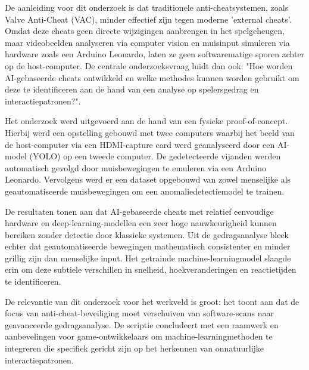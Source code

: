 De aanleiding voor dit onderzoek is dat traditionele anti-cheatsystemen, zoals Valve Anti-Cheat (VAC), minder effectief zijn tegen moderne 'external cheats'. Omdat deze cheats geen directe wijzigingen aanbrengen in het spelgeheugen, maar videobeelden analyseren via computer vision en muisinput simuleren via hardware zoals een Arduino Leonardo, laten ze geen softwarematige sporen achter op de host-computer. De centrale onderzoeksvraag luidt dan ook: "Hoe worden AI-gebaseerde cheats ontwikkeld en welke methodes kunnen worden gebruikt om deze te identificeren aan de hand van een analyse op spelersgedrag en interactiepatronen?".

Het onderzoek werd uitgevoerd aan de hand van een fysieke proof-of-concept. Hierbij werd een opstelling gebouwd met twee computers waarbij het beeld van de host-computer via een HDMI-capture card werd geanalyseerd door een AI-model (YOLO) op een tweede computer. De gedetecteerde vijanden werden automatisch gevolgd door muisbewegingen te emuleren via een Arduino Leonardo. Vervolgens werd er een dataset opgebouwd van zowel menselijke als geautomatiseerde muisbewegingen om een anomaliedetectiemodel te trainen.

De resultaten tonen aan dat AI-gebaseerde cheats met relatief eenvoudige hardware en deep-learning-modellen een zeer hoge nauwkeurigheid kunnen bereiken zonder detectie door klassieke systemen. Uit de gedragsanalyse bleek echter dat geautomatiseerde bewegingen mathematisch consistenter en minder grillig zijn dan menselijke input. Het getrainde machine-learningmodel slaagde erin om deze subtiele verschillen in snelheid, hoekveranderingen en reactietijden te identificeren.

De relevantie van dit onderzoek voor het werkveld is groot: het toont aan dat de focus van anti-cheat-beveiliging moet verschuiven van software-scans naar geavanceerde gedragsanalyse. De scriptie concludeert met een raamwerk en aanbevelingen voor game-ontwikkelaars om machine-learningmethoden te integreren die specifiek gericht zijn op het herkennen van onnatuurlijke interactiepatronen.
